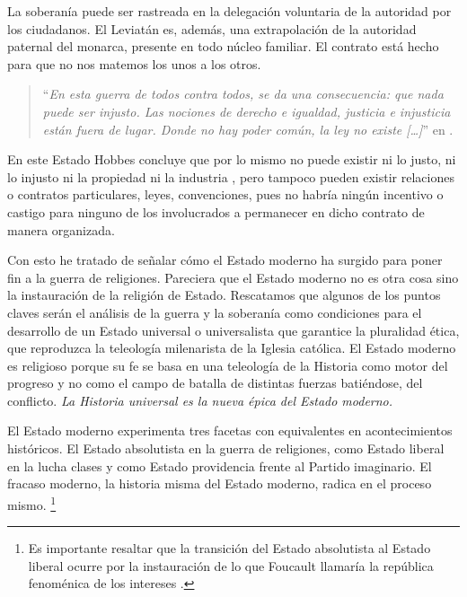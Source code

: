 La soberanía puede ser rastreada en la delegación voluntaria de la autoridad por los ciudadanos. El Leviatán es, además, una extrapolación de la autoridad paternal del monarca, presente en todo núcleo familiar. El contrato está hecho para que no nos matemos los unos a los otros.

\begin{quote}
  \enquote{\emph{En esta guerra de todos contra todos, se da una consecuencia: que nada puede ser injusto. Las nociones de derecho e igualdad, justicia e injusticia están fuera de lugar. Donde no hay poder común, la ley no existe [\ldots]}} en \autocite[Capítulo 13]{hobbesLeviatan2007}.
\end{quote}

En este Estado Hobbes concluye que por lo mismo no puede existir ni lo justo, ni lo injusto ni la propiedad ni la industria \autocite{hobbesLeviatan2007}, pero tampoco pueden existir relaciones o contratos particulares, leyes, convenciones, pues no habría ningún incentivo o castigo para ninguno de los involucrados a permanecer en dicho contrato de manera organizada.

Con esto he tratado de señalar cómo el Estado moderno ha surgido para poner fin a la guerra de religiones. Pareciera que el Estado moderno no es otra cosa sino la instauración de la religión de Estado. Rescatamos que algunos de los puntos claves serán el análisis de la guerra y la soberanía como condiciones para el desarrollo de un Estado universal o universalista que garantice la pluralidad ética, que reproduzca la teleología milenarista de la Iglesia católica. El Estado moderno es religioso porque su fe se basa en una teleología de la Historia como motor del progreso y no como el campo de batalla de distintas fuerzas batiéndose, del conflicto. \emph{La Historia universal es la nueva épica del Estado moderno.}

El Estado moderno experimenta tres facetas con equivalentes en acontecimientos históricos. El Estado absolutista en la guerra de religiones, como Estado liberal en la lucha clases y como Estado providencia frente al Partido imaginario. El fracaso moderno, la historia misma del Estado moderno, radica en el proceso mismo. \footnote{Es importante resaltar que la transición del Estado absolutista al Estado liberal ocurre por la instauración de lo que Foucault llamaría la república fenoménica de los intereses \autocite{tiqqunIntroduccionGuerraCivil2008}.}

